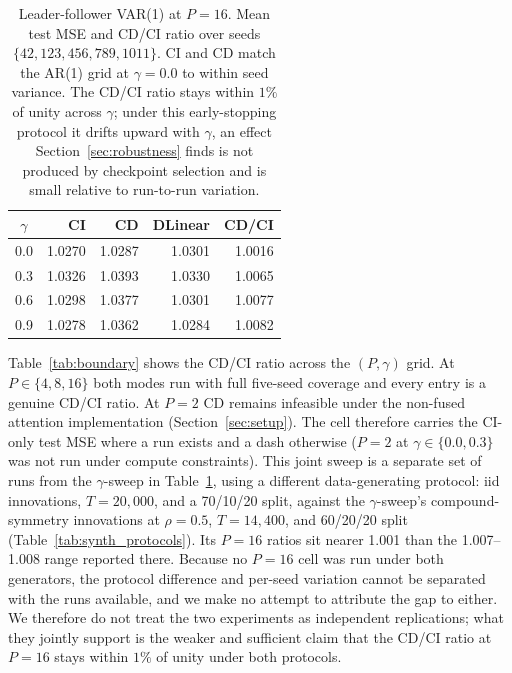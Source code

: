 \documentclass[10pt]{article} %
\begin{document}
    \begin{table}[htbp]
        \centering
        \caption{Leader-follower VAR(1) at $P = 16$. Mean test MSE and CD/CI ratio over seeds
            $\{42, 123, 456, 789, 1011\}$. CI and CD match the AR(1) grid at $\gamma = 0.0$ to within seed variance.
            The CD/CI ratio stays within $1\%$ of unity across $\gamma$; under this early-stopping protocol it drifts
            upward with $\gamma$, an effect Section~\ref{sec:robustness} finds is not produced by checkpoint
            selection and is small relative to run-to-run variation.}
        \label{tab:lf_p16}
        \begin{tabular}{crrrr}
            \toprule
            $\gamma$ & CI     & CD     & DLinear & CD/CI  \\
            \midrule
            0.0      & 1.0270 & 1.0287 & 1.0301  & 1.0016 \\
            0.3      & 1.0326 & 1.0393 & 1.0330  & 1.0065 \\
            0.6      & 1.0298 & 1.0377 & 1.0301  & 1.0077 \\
            0.9      & 1.0278 & 1.0362 & 1.0284  & 1.0082 \\
            \bottomrule
        \end{tabular}
    \end{table}

    Table~\ref{tab:boundary} shows the CD/CI ratio across the $(P, \gamma)$ grid. At $P \in \{4, 8, 16\}$ both modes run
    with full five-seed coverage and every entry is a genuine CD/CI ratio. At $P = 2$ CD remains infeasible under the non-fused
    attention implementation (Section~\ref{sec:setup}). The cell therefore carries the CI-only test MSE where a run exists
    and a dash otherwise ($P = 2$ at $\gamma \in \{0.0, 0.3\}$ was not run under compute constraints). This joint sweep is
    a separate set of runs from the $\gamma$-sweep in Table~\ref{tab:lf_p16}, using a different data-generating protocol: iid
    innovations, $T = 20{,}000$, and a 70/10/20 split, against the $\gamma$-sweep's compound-symmetry innovations at
    $\rho = 0.5$, $T = 14{,}400$, and 60/20/20 split (Table~\ref{tab:synth_protocols}). Its $P = 16$ ratios sit nearer 1.001
    than the 1.007--1.008 range reported there. Because no $P = 16$ cell was run under both generators, the protocol difference
    and per-seed variation cannot be separated with the runs available, and we make no attempt to attribute the gap to either.
    We therefore do not treat the two experiments as independent replications; what they jointly support is the weaker and
    sufficient claim that the CD/CI ratio at $P = 16$ stays within $1\%$ of unity under both protocols.
\end{document}
